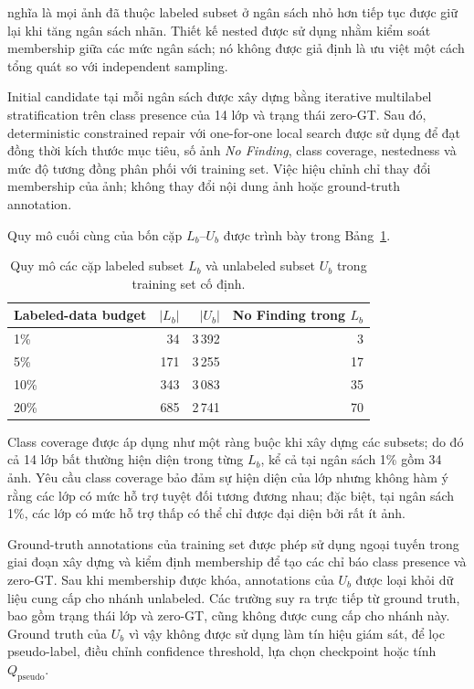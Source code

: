 \documentclass[pdflatex,sn-mathphys-num]{sn-jnl}%
\theoremstyle{thmstyleone}%
\theoremstyle{thmstyletwo}%
\theoremstyle{thmstylethree}%
\begin{document}
nghĩa là mọi ảnh đã thuộc labeled subset ở ngân sách nhỏ hơn tiếp tục được
giữ lại khi tăng ngân sách nhãn. Thiết kế nested được sử dụng nhằm kiểm soát
membership giữa các mức ngân sách; nó không được giả định là ưu việt một
cách tổng quát so với independent sampling.

Initial candidate tại mỗi ngân sách được xây dựng bằng iterative multilabel
stratification trên class presence của 14 lớp và trạng thái zero-GT. Sau
đó, deterministic constrained repair với one-for-one local search được sử
dụng để đạt đồng thời kích thước mục tiêu, số ảnh
\textit{No Finding}, class coverage, nestedness và mức độ tương đồng phân
phối với training set. Việc hiệu chỉnh chỉ thay đổi membership của ảnh;
không thay đổi nội dung ảnh hoặc ground-truth annotation.

Quy mô cuối cùng của bốn cặp \(L_b\)--\(U_b\) được trình bày trong
Bảng~\ref{tab:labeled_unlabeled_budgets}.

\begin{table}[htbp]
    \centering
    \caption{Quy mô các cặp labeled subset \(L_b\) và unlabeled subset \(U_b\)
trong training set cố định.}
    \label{tab:labeled_unlabeled_budgets}
    \small
    \begin{tabular}{lrrr}
        \toprule
        \textbf{Labeled-data budget} &
        \textbf{\( |L_b| \)} &
        \textbf{\( |U_b| \)} &
        \textbf{No Finding trong \(L_b\)} \\
        \midrule
        1\%  & 34  & 3\,392 & 3  \\
        5\%  & 171 & 3\,255 & 17 \\
        10\% & 343 & 3\,083 & 35 \\
        20\% & 685 & 2\,741 & 70 \\
        \bottomrule
    \end{tabular}
\end{table}

Class coverage được áp dụng như một ràng buộc khi xây dựng các subsets;
do đó cả 14 lớp bất thường hiện diện trong từng \(L_b\), kể cả tại ngân
sách 1\% gồm 34 ảnh. Yêu cầu class coverage bảo đảm sự hiện diện của lớp
nhưng không hàm ý rằng các lớp có mức hỗ trợ tuyệt đối tương đương nhau;
đặc biệt, tại ngân sách 1\%, các lớp có mức hỗ trợ thấp có thể chỉ được
đại diện bởi rất ít ảnh.

Ground-truth annotations của training set được phép sử dụng ngoại tuyến
trong giai đoạn xây dựng và kiểm định membership để tạo các chỉ báo class
presence và zero-GT. Sau khi membership được khóa, annotations của
\(U_b\) được loại khỏi dữ liệu cung cấp cho nhánh unlabeled. Các trường
suy ra trực tiếp từ ground truth, bao gồm trạng thái lớp và zero-GT, cũng
không được cung cấp cho nhánh này. Ground truth của \(U_b\) vì vậy không
được sử dụng làm tín hiệu giám sát, để lọc pseudo-label, điều chỉnh
confidence threshold, lựa chọn checkpoint hoặc tính
\(Q_{\mathrm{pseudo}}\).
\end{document}
